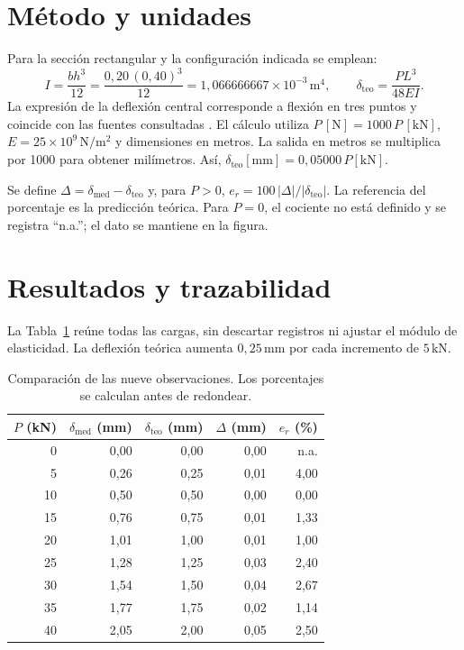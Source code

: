 \documentclass[11pt,a4paper]{article}
\begin{document}
\section{Método y unidades}
Para la sección rectangular y la configuración indicada se emplean:
\begin{equation}
I=\frac{bh^3}{12}=\frac{0{,}20\,(0{,}40)^3}{12}
=\ensuremath{1{,}066666667\times10^{-3}\,\mathrm{m}^{4}},\qquad
\delta_{\mathrm{teo}}=\frac{PL^3}{48EI}.
\label{eq:modelo}
\end{equation}
La expresión de la deflexión central corresponde a flexión en tres puntos y coincide con las fuentes consultadas \cite{roylance2000,wierzbicki2013}. El cálculo utiliza $P\,[\mathrm{N}]=1000\,P\,[\mathrm{kN}]$, $E=25\times10^9\,\mathrm{N/m^2}$ y dimensiones en metros. La salida en metros se multiplica por 1000 para obtener milímetros. Así, $\delta_{\mathrm{teo}}[\mathrm{mm}]=0{,}05000\,P[\mathrm{kN}]$.

Se define $\Delta=\delta_{\mathrm{med}}-\delta_{\mathrm{teo}}$ y, para $P>0$, $e_r=100\,|\Delta|/|\delta_{\mathrm{teo}}|$. La referencia del porcentaje es la predicción teórica. Para $P=0$, el cociente no está definido y se registra ``n.a.''; el dato se mantiene en la figura.

\newpage
\section{Resultados y trazabilidad}
La Tabla~\ref{tab:resultados} reúne todas las cargas, sin descartar registros ni ajustar el módulo de elasticidad. La deflexión teórica aumenta \ensuremath{0{,}25\,\mathrm{mm}} por cada incremento de \ensuremath{5\,\mathrm{kN}}.

\begin{table}[H]
\centering
\caption{Comparación de las nueve observaciones. Los porcentajes se calculan antes de redondear.}
\label{tab:resultados}
\renewcommand{\arraystretch}{1.20}
\begin{tabular}{rrrrr}
\toprule
$P$ (kN) & $\delta_{\mathrm{med}}$ (mm) & $\delta_{\mathrm{teo}}$ (mm) & $\Delta$ (mm) & $e_r$ (\%) \\
\midrule
0  & 0,00 & 0,00 & 0,00 & n.a. \\
5  & 0,26 & 0,25 & 0,01 & 4,00 \\
10 & 0,50 & 0,50 & 0,00 & 0,00 \\
15 & 0,76 & 0,75 & 0,01 & 1,33 \\
20 & 1,01 & 1,00 & 0,01 & 1,00 \\
25 & 1,28 & 1,25 & 0,03 & 2,40 \\
30 & 1,54 & 1,50 & 0,04 & 2,67 \\
35 & 1,77 & 1,75 & 0,02 & 1,14 \\
40 & 2,05 & 2,00 & 0,05 & 2,50 \\
\bottomrule
\end{tabular}
\end{table}
\end{document}

